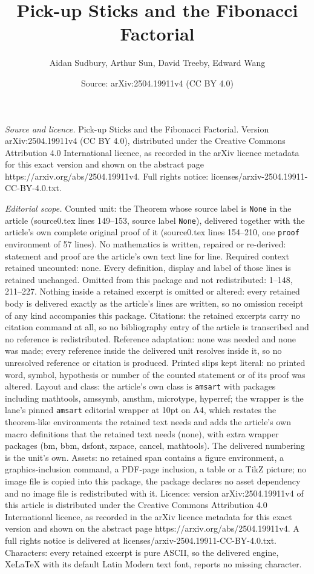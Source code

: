 \documentclass[10pt,a4paper]{amsart}
\title[Pick-up Sticks and the Fibonacci Factorial]{Pick-up Sticks and the Fibonacci Factorial}
\author{Aidan Sudbury, Arthur Sun, David Treeby, Edward Wang}
\date{Source: arXiv:2504.19911v4 (CC BY 4.0)}
\begin{document}
\maketitle

\noindent\emph{Source and licence.} Pick-up Sticks and the Fibonacci Factorial. Version arXiv:2504.19911v4 (CC BY 4.0), distributed under the Creative Commons Attribution 4.0 International licence, as recorded in the arXiv licence metadata for this exact version and shown on the abstract page https://arxiv.org/abs/2504.19911v4. Full rights notice: licenses/arxiv-2504.19911-CC-BY-4.0.txt.\par\smallskip

\noindent\textit{Editorial scope.} Counted unit: the Theorem whose source label is \texttt{None} in the article (source0.tex lines 149--153, source label \texttt{None}), delivered together with the article's own complete original proof of it (source0.tex lines 154--210, one \texttt{proof} environment of 57 lines). No mathematics is written, repaired or re-derived: statement and proof are the article's own text line for line. Required context retained uncounted: none. Every definition, display and label of those lines is retained unchanged. Omitted from this package and not redistributed: 1--148, 211--227. Nothing inside a retained excerpt is omitted or altered: every retained body is delivered exactly as the article's lines are written, so no omission receipt of any kind accompanies this package. Citations: the retained excerpts carry no citation command at all, so no bibliography entry of the article is transcribed and no reference is redistributed. Reference adaptation: none was needed and none was made; every reference inside the delivered unit resolves inside it, so no unresolved reference or citation is produced. Printed slips kept literal: no printed word, symbol, hypothesis or number of the counted statement or of its proof was altered. Layout and class: the article's own class is \texttt{amsart} with packages including mathtools, amssymb, amsthm, microtype, hyperref; the wrapper is the lane's pinned \texttt{amsart} editorial wrapper at 10pt on A4, which restates the theorem-like environments the retained text needs and adds the article's own macro definitions that the retained text needs (none), with extra wrapper packages (bm, bbm, dsfont, xspace, cancel, mathtools). The delivered numbering is the unit's own. Assets: no retained span contains a figure environment, a graphics-inclusion command, a PDF-page inclusion, a table or a TikZ picture; no image file is copied into this package, the package declares no asset dependency and no image file is redistributed with it. Licence: version arXiv:2504.19911v4 of this article is distributed under the Creative Commons Attribution 4.0 International licence, as recorded in the arXiv licence metadata for this exact version and shown on the abstract page https://arxiv.org/abs/2504.19911v4. A full rights notice is delivered at licenses/arxiv-2504.19911-CC-BY-4.0.txt. Characters: every retained excerpt is pure ASCII, so the delivered engine, XeLaTeX with its default Latin Modern text font, reports no missing character.
\end{document}
